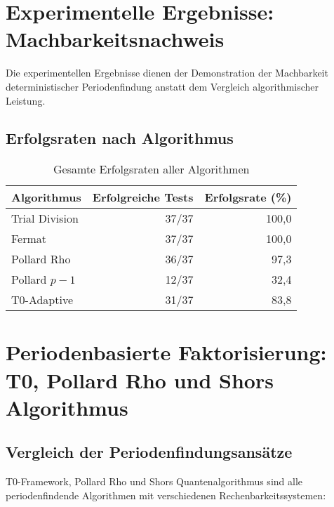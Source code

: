 \documentclass[12pt,a4paper]{article}
\begin{document}
	\section{Experimentelle Ergebnisse: Machbarkeitsnachweis}
	
	Die experimentellen Ergebnisse dienen der Demonstration der Machbarkeit deterministischer Periodenfindung anstatt dem Vergleich algorithmischer Leistung.
	
	\subsection{Erfolgsraten nach Algorithmus}
	
	\begin{table}[H]
		\centering
		\caption{Gesamte Erfolgsraten aller Algorithmen}
		\begin{tabular}{lrr}
			\toprule
			\textbf{Algorithmus} & \textbf{Erfolgreiche Tests} & \textbf{Erfolgsrate (\%)} \\
			\midrule
			Trial Division & 37/37 & 100,0 \\
			Fermat & 37/37 & 100,0 \\
			Pollard Rho & 36/37 & 97,3 \\
			Pollard $p-1$ & 12/37 & 32,4 \\
			T0-Adaptive & 31/37 & 83,8 \\
			\bottomrule
		\end{tabular}
		\label{tab:success_rates}
	\end{table}
	
	\section{Periodenbasierte Faktorisierung: T0, Pollard Rho und Shors Algorithmus}
	
	\subsection{Vergleich der Periodenfindungsansätze}
	
	T0-Framework, Pollard Rho und Shors Quantenalgorithmus sind alle periodenfindende Algorithmen mit verschiedenen Rechenbarkeitssystemen:
	
\end{document}
